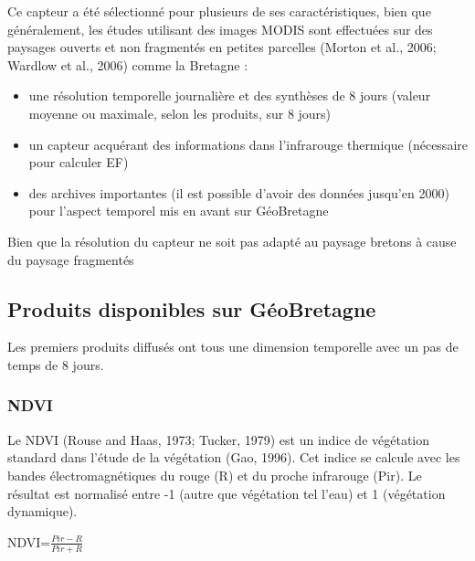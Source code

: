 \documentclass[10pt,a4paper]{article}
\begin{document}
Ce capteur a été sélectionné pour plusieurs de ses caractéristiques, bien que généralement, les études utilisant des images MODIS sont effectuées sur des paysages ouverts et non fragmentés en petites parcelles (Morton et al., 2006; Wardlow et al., 2006) comme la Bretagne :
\begin{itemize}
\item une résolution temporelle journalière et des synthèses de 8 jours (valeur moyenne ou maximale, selon les produits, sur 8 jours)
\item un capteur acquérant des informations dans l'infrarouge thermique (nécessaire pour calculer EF)
\item des archives importantes (il est possible d'avoir des données jusqu'en 2000) pour l'aspect temporel mis en avant sur GéoBretagne
\end{itemize}

Bien que la résolution du capteur ne soit pas adapté au paysage bretons à cause du paysage fragmentés
\subsection{Produits disponibles sur GéoBretagne}

Les premiers produits diffusés ont tous une dimension temporelle avec un pas de temps de 8 jours.

\subsubsection{NDVI}

Le NDVI (Rouse and Haas, 1973; Tucker, 1979) est un indice de végétation standard dans l'étude de la végétation (Gao, 1996). Cet indice se calcule avec les bandes électromagnétiques du rouge (R) et du proche infrarouge (Pir). Le résultat est normalisé entre -1 (autre que végétation tel l'eau) et 1 (végétation dynamique).\smallbreak

\begin{center}
\textrm{NDVI}=$ \frac{Pir-R}{Pir+R} $
\end{center}\smallbreak
\end{document}
